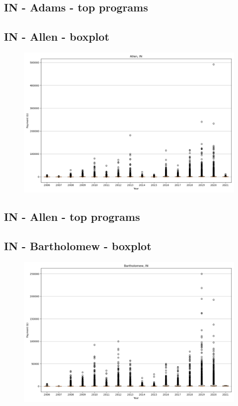 \subsection*{IN - Adams - top programs}

\newpage
\subsection*{IN - Allen - boxplot}
\begin{figure}[h]
\centering
\includegraphics[width=7in]{../output/boxplots/counties/Allen-IN_boxplot.png}
\end{figure}


\subsection*{IN - Allen - top programs}

\newpage
\subsection*{IN - Bartholomew - boxplot}
\begin{figure}[h]
\centering
\includegraphics[width=7in]{../output/boxplots/counties/Bartholomew-IN_boxplot.png}
\end{figure}


